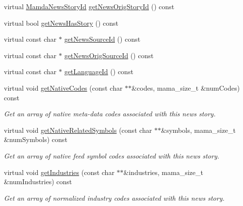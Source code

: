 \begin{CompactItemize}
\item 
virtual \hyperlink{namespaceWombat_f7b94f4bb44eb78420c0d3ba0413424e}{Mamda\-News\-Story\-Id} \hyperlink{classWombat_1_1MamdaNewsHeadline_06be0c043515b210d54e7a345577a13e}{get\-News\-Orig\-Story\-Id} () const 
\item 
virtual bool \hyperlink{classWombat_1_1MamdaNewsHeadline_934c8dded380d1c59a0d9d59528f81b5}{get\-News\-Has\-Story} () const 
\item 
virtual const char $\ast$ \hyperlink{classWombat_1_1MamdaNewsHeadline_7566bd0297c11ef707348d9d3646363b}{get\-News\-Source\-Id} () const 
\item 
virtual const char $\ast$ \hyperlink{classWombat_1_1MamdaNewsHeadline_1e7a0a1b7ac2373b2d59c474f8962527}{get\-News\-Orig\-Source\-Id} () const 
\item 
virtual const char $\ast$ \hyperlink{classWombat_1_1MamdaNewsHeadline_9142e41e5db9786622ffcd517b68d3b9}{get\-Language\-Id} () const 
\item 
virtual void \hyperlink{classWombat_1_1MamdaNewsHeadline_49a407e757b36783514598581d4ce941}{get\-Native\-Codes} (const char $\ast$$\ast$\&codes, mama\_\-size\_\-t \&num\-Codes) const 
\begin{CompactList}\small\item\em Get an array of native meta-data codes associated with this news story. \item\end{CompactList}\item 
virtual void \hyperlink{classWombat_1_1MamdaNewsHeadline_35caf4a0f9aa24db2903ae45042200c1}{get\-Native\-Related\-Symbols} (const char $\ast$$\ast$\&symbols, mama\_\-size\_\-t \&num\-Symbols) const 
\begin{CompactList}\small\item\em Get an array of native feed symbol codes associated with this news story. \item\end{CompactList}\item 
virtual void \hyperlink{classWombat_1_1MamdaNewsHeadline_6dd281e1212cf8a7efca3da2aec7d020}{get\-Industries} (const char $\ast$$\ast$\&industries, mama\_\-size\_\-t \&num\-Industries) const 
\begin{CompactList}\small\item\em Get an array of normalized industry codes associated with this news story. \item\end{CompactList}\item 
$$
\end{CompactItemize}
